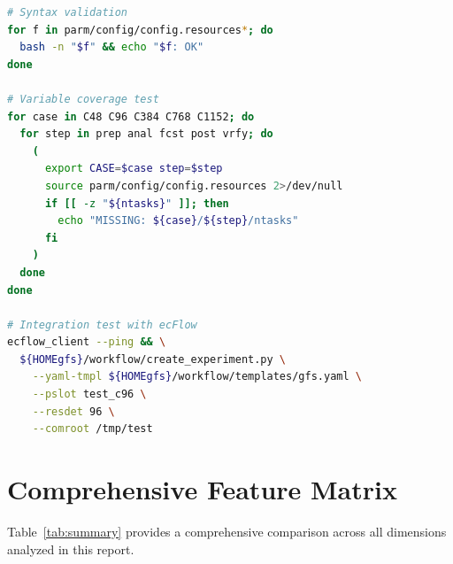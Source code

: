\documentclass[11pt,twoside]{article}
\newcommand{\gw}{\textsc{Global-Workflow}}
\begin{document}
\begin{minipage}{\linewidth}
\begin{lstlisting}[language=Bash, caption={\gw{} Test Patterns}]
# Syntax validation
for f in parm/config/config.resources*; do
  bash -n "$f" && echo "$f: OK"
done

# Variable coverage test
for case in C48 C96 C384 C768 C1152; do
  for step in prep anal fcst post vrfy; do
    (
      export CASE=$case step=$step
      source parm/config/config.resources 2>/dev/null
      if [[ -z "${ntasks}" ]]; then
        echo "MISSING: ${case}/${step}/ntasks"
      fi
    )
  done
done

# Integration test with ecFlow
ecflow_client --ping && \
  ${HOMEgfs}/workflow/create_experiment.py \
    --yaml-tmpl ${HOMEgfs}/workflow/templates/gfs.yaml \
    --pslot test_c96 \
    --resdet 96 \
    --comroot /tmp/test
\end{lstlisting}
\end{minipage}

\clearpage
\section{Comprehensive Feature Matrix}
\label{sec:matrix}

\noindent Table~\ref{tab:summary} provides a comprehensive comparison across all dimensions analyzed in this report.
\end{document}
